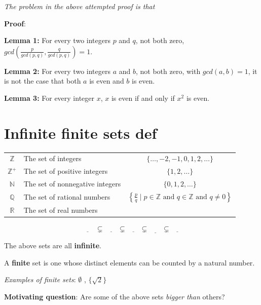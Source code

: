 \documentclass[12pt, oneside]{article}
\begin{document}
{\it The problem in the above attempted proof is that} \underline{\phantom{it only considers one candidate witness
and does not prove that no witnesses exist.}}


{\bf Proof}: 

\vfill

\vfill



{\bf Lemma 1:} For every two integers $p$  and  $q$, not both zero, $gcd\left( \frac{p}{gcd(p,q) },  \frac{q}{gcd(p,q)} \right) =  1$.


{\bf Lemma 2:} For every two integers $a$ and  $b$, not both zero, with  $gcd(a,b) = 1$, it is not the case that both $a$
is  even and $b$ is even.


{\bf Lemma 3:} For every integer  $x$, $x$ is  even if and only if $x^2$  is even.

\vfill \vfill
\section*{Infinite finite sets def}


\begin{tabular}{clc}
    $\mathbb{Z}$ &  The  set of integers  & $\{ \ldots, -2, -1, 0,  1, 2, \ldots\}$ \\
    $\mathbb{Z}^+$ &  The  set of positive integers  & $\{1, 2, \ldots\}$ \\
    $\mathbb{N}$ &  The  set of nonnegative integers  & $\{0, 1, 2, \ldots\}$ \\
    $\mathbb{Q}$ &  The  set of rational numbers  & $\left\{ \frac{p}{q} \mid p \in \mathbb{Z}  \text{ and  } q  \in \mathbb{Z} \text{ and } q \neq  0 \right\}$\\
    $\mathbb{R}$ & The  set  of  real numbers &  \\
    \end{tabular}
    \[
    \underline{\phantom{\mathbb{Z}^+}} ~~\subsetneq~~ \underline{\phantom{\mathbb{N}~}} ~~\subsetneq ~~\underline{\phantom{\mathbb{Z}~}}~~ \subsetneq~~ \underline{\phantom{\mathbb{Q}~}} 
    ~~\subsetneq~~ \underline{\phantom{\mathbb{R}~}} 
    \]
    
    
    The above sets are all {\bf infinite}.
    
    
    A {\bf finite} set is one whose distinct elements can be counted by a natural number.
    
    {\it Examples of finite sets}: $\emptyset$ , $\{ \sqrt{2} \}$
    
    
    {\bf Motivating question}: Are some of the above sets {\it bigger than} others? \vfill
\end{document}
